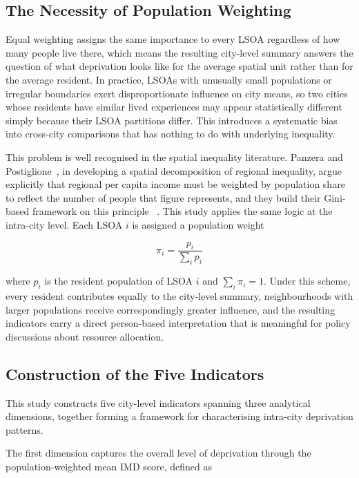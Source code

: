 \documentclass[11pt,journal,compsoc]{IEEEtran}
\begin{document}
\subsection{The Necessity of Population Weighting}

 Equal weighting assigns the same importance to every LSOA regardless of how many people live there, which means the resulting city-level summary answers the question of what deprivation looks like for the average spatial unit rather than for the average resident. In practice, LSOAs with unusually small populations or irregular boundaries exert disproportionate influence on city means, so two cities whose residents have similar lived experiences may appear statistically different simply because their LSOA partitions differ. This introduces a systematic bias into cross-city comparisons that has nothing to do with underlying inequality.

This problem is well recognised in the spatial inequality literature. Panzera and Postiglione~\cite{panzera2020measuring}, in developing a spatial decomposition of regional inequality, argue explicitly that regional per capita income must be weighted by population share to reflect the number of people that figure represents, and they build their Gini-based framework on this principle ~\cite{mookherjee1982decomposition}. This study applies the same logic at the intra-city level. Each LSOA $i$ is assigned a population weight

$$\pi_i = \frac{p_i}{\sum_i p_i}$$

where $p_i$ is the resident population of LSOA $i$ and $\sum_i \pi_i = 1$. Under this scheme, every resident contributes equally to the city-level summary, neighbourhoods with larger populations receive correspondingly greater influence, and the resulting indicators carry a direct person-based interpretation that is meaningful for policy discussions about resource allocation.

\subsection{Construction of the Five Indicators}

This study constructs five city-level indicators spanning three analytical dimensions, together forming a framework for characterising intra-city deprivation patterns.

The first dimension captures the overall level of deprivation through the population-weighted mean IMD score, defined as
\end{document}
